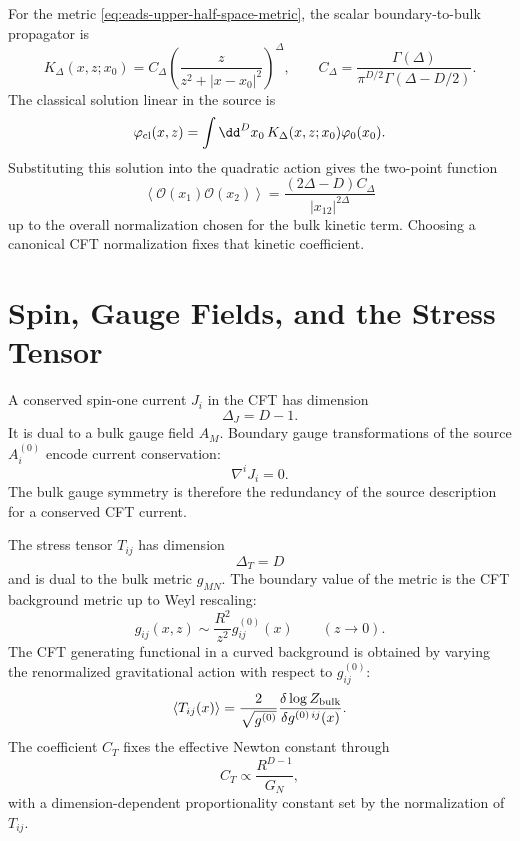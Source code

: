 For the metric \eqref{eq:eads-upper-half-space-metric}, the scalar
boundary-to-bulk propagator is
\begin{equation}
  K_\Delta(x,z;x_0)
  =
  C_\Delta
  \left(
    \frac{z}{z^2+|x-x_0|^2}
  \right)^\Delta,
  \qquad
  C_\Delta=
  \frac{\Gamma(\Delta)}
       {\pi^{D/2}\Gamma(\Delta-D/2)}.
  \label{eq:boundary-to-bulk-propagator}
\end{equation}
The classical solution linear in the source is
\[
  \varphi_{\rm cl}(x,z)
  =
  \int\dd^Dx_0\,K_\Delta(x,z;x_0)\varphi_0(x_0).
\]
Substituting this solution into the quadratic action gives the two-point
function
\begin{equation}
  \left\langle\mathcal O(x_1)\mathcal O(x_2)\right\rangle
  =
  \frac{(2\Delta-D)C_\Delta}{|x_{12}|^{2\Delta}}
  \label{eq:holographic-scalar-two-point-function}
\end{equation}
up to the overall normalization chosen for the bulk kinetic term.  Choosing a
canonical CFT normalization fixes that kinetic coefficient.

\section{Spin, Gauge Fields, and the Stress Tensor}

A conserved spin-one current \(J_i\) in the CFT has dimension
\[
  \Delta_J=D-1.
\]
It is dual to a bulk gauge field \(A_M\).  Boundary gauge transformations of
the source \(A_i^{(0)}\) encode current conservation:
\[
  \nabla^iJ_i=0.
\]
The bulk gauge symmetry is therefore the redundancy of the source description
for a conserved CFT current.

The stress tensor \(T_{ij}\) has dimension
\[
  \Delta_T=D
\]
and is dual to the bulk metric \(g_{MN}\).  The boundary value of the metric
is the CFT background metric up to Weyl rescaling:
\[
  g_{ij}(x,z)
  \sim
  \frac{R^2}{z^2}g^{(0)}_{ij}(x)
  \qquad
  (z\to0).
\]
The CFT generating functional in a curved background is obtained by varying
the renormalized gravitational action with respect to \(g^{(0)}_{ij}\):
\[
  \left\langle T_{ij}(x)\right\rangle
  =
  \frac{2}{\sqrt{g^{(0)}}}
  \frac{\delta \log Z_{\rm bulk}}{\delta g^{(0)\,ij}(x)}.
\]
The coefficient \(C_T\) fixes the effective Newton constant through
\[
  C_T\propto \frac{R^{D-1}}{G_N},
\]
with a dimension-dependent proportionality constant set by the normalization
of \(T_{ij}\).

